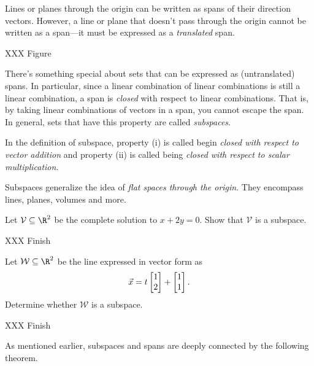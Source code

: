 Lines or planes through the origin can be written as spans
of their direction vectors. However, a line or plane that doesn't
pass through the origin cannot be written as a span---it must
be expressed as a \emph{translated} span.

XXX Figure


There's something special about sets that can be expressed as 
(untranslated) spans. In particular, since a linear combination
of linear combinations is still a linear combination, a span
is \emph{closed} with respect to linear combinations. That is, 
by taking linear combinations of vectors in a span, you cannot
escape the span. In general, sets that have this property are called
\emph{subspaces}.


In the definition of subspace, property (i) is called
	begin \emph{closed with respect to vector addition} and
	property (ii) is called being \emph{closed with respect to
	scalar multiplication}.

Subspaces generalize the idea of \emph{flat spaces through the origin}. They encompass
lines, planes, volumes and more.

\begin{example}
	Let $\mathcal V\subseteq \R^2$ be the complete solution to 
	$x+2y=0$.  Show that $\mathcal V$ is a subspace.

	XXX Finish
\end{example}

\begin{example}
	Let $\mathcal W\subseteq \R^2$ be the line expressed in vector form
	as 
	\[
		\vec x=t\mat{1\\2}+\mat{1\\1}.
	\]
	Determine whether $\mathcal W$ is a subspace.

	XXX Finish
\end{example}


As mentioned earlier, subspaces and spans are deeply connected
by the following theorem.

